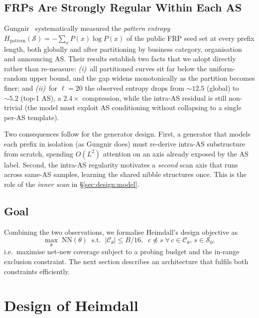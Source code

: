\documentclass[conference]{IEEEtran}
\begin{document}
\subsection{FRPs Are Strongly Regular Within Each AS}
\label{sec:motivation:entropy}
Gungnir~\cite{wei2025gungnir} systematically measured the
\emph{pattern entropy}
$H_{\mathrm{pattern}}(\mathcal{S})=-\!\sum_x P(x)\log P(x)$
of the public FRP seed set at every prefix length, both globally
and after partitioning by business category, organisation and
announcing AS.  Their results establish two facts that we adopt
directly rather than re-measure: \emph{(i)}~all partitioned
curves sit far below the uniform-random upper bound, and the gap
widens monotonically as the partition becomes finer; and
\emph{(ii)}~for $\ell{=}20$ the observed entropy drops from
$\sim\!12.5$ (global) to $\sim\!5.2$ (top-1 AS), a $2.4\times$
compression, while the intra-AS residual is still non-trivial
(the model must exploit AS conditioning without collapsing to a
single per-AS template).

Two consequences follow for the generator design.  First, a
generator that models each prefix in isolation (as Gungnir does)
must re-derive intra-AS substructure from scratch, spending
$O(L^2)$ attention on an axis already exposed by the AS label.
Second, the intra-AS regularity motivates a \emph{second} scan
axis that runs across same-AS samples, learning the shared
nibble structures once.  This is the role of the \emph{inner
scan} in \S\ref{sec:design:model}.

\subsection{Goal}
Combining the two observations, we formalise Heimdall's design
objective as
\begin{equation}
\max_{\theta}\; \mathrm{NN}(\theta) \;\;
\text{s.t.}\;\; |\mathcal{C}_\theta|\!\le\!B/16,\;\;
c\not\preceq s\;\forall\,c\!\in\!\mathcal{C}_\theta,\,
s\!\in\!\mathcal{S}_{0},
\label{eq:obj}
\end{equation}
i.e.\ maximise net-new coverage subject to a probing budget
and the in-range exclusion constraint.  The next section
describes an architecture that fulfils both constraints
efficiently.


\section{Design of Heimdall}\label{sec:design}
\end{document}
